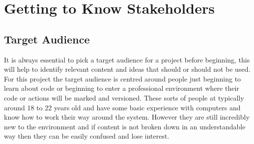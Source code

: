 
\section{Getting to Know Stakeholders}
\subsection{Target Audience}
It is always essential to pick a target audience for a project before beginning, this will help to identify relevant content and ideas that should or should not be used. For this project the target audience is centred around people just beginning to learn about code or beginning to enter a professional environment where their code or actions will be marked and versioned. These sorts of people at typically around 18 to 22 years old and have some basic experience with computers and know how to work their way around the system. However they are still incredibly new to the environment and if content is not broken down in an understandable way then they can be easily confused and lose interest.

